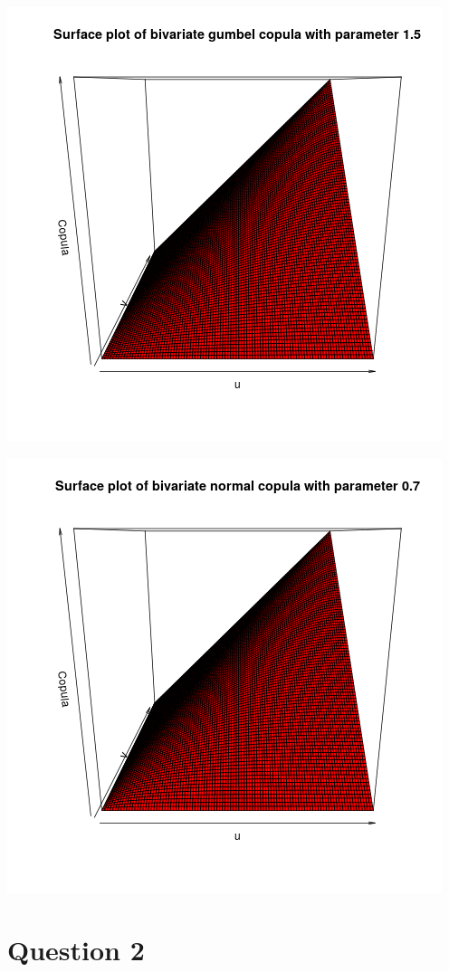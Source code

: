 \documentclass{article}
\begin{document}
\includegraphics{"plot_q1_1"}
\pagebreak

\includegraphics{"plot_q1_2"}
\pagebreak


\section{Question 2}
\end{document}
